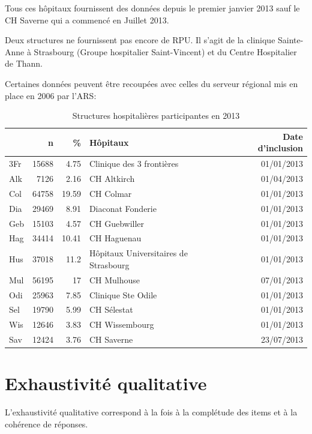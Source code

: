 \documentclass[12pt,english,french,twoside]{report}\usepackage[]{graphicx}\usepackage[]{color}
\begin{document}
Tous ces hôpitaux fournissent des données depuis le premier janvier 2013 sauf le CH Saverne qui a commencé en Juillet 2013.

Deux structures ne fournissent pas encore de RPU. Il s'agit de la clinique Sainte-Anne à Strasbourg (Groupe hospitalier Saint-Vincent) et du Centre Hospitalier de Thann.

Certaines données peuvent être recoupées avec celles du serveur régional mis en place en 2006 par l'ARS: 


\begin{table}[ht]
\centering
\begin{tabular}{|l|r|r|l|r|}
  \hline
 & n & \% & Hôpitaux & Date d'inclusion \\ 
  \hline
3Fr & 15688 & 4.75 & Clinique des 3 frontières & 01/01/2013 \\ 
  Alk & 7126 & 2.16 & CH Altkirch & 01/04/2013 \\ 
  Col & 64758 & 19.59 & CH Colmar & 01/01/2013 \\ 
  Dia & 29469 & 8.91 & Diaconat Fonderie & 01/01/2013 \\ 
  Geb & 15103 & 4.57 & CH Guebwiller & 01/01/2013 \\ 
  Hag & 34414 & 10.41 & CH Haguenau & 01/01/2013 \\ 
  Hus & 37018 & 11.2 & Hôpitaux Universitaires de Strasbourg & 01/01/2013 \\ 
  Mul & 56195 & 17 & CH Mulhouse & 07/01/2013 \\ 
  Odi & 25963 & 7.85 & Clinique Ste Odile & 01/01/2013 \\ 
  Sel & 19790 & 5.99 & CH Sélestat & 01/01/2013 \\ 
  Wis & 12646 & 3.83 & CH Wissembourg & 01/01/2013 \\ 
  Sav & 12424 & 3.76 & CH Saverne & 23/07/2013 \\ 
   \hline
\end{tabular}
\caption{Structures hospitalières participantes en 2013} 
\label{tab1}
\end{table}



\section{Exhaustivité qualitative}

L'exhaustivité qualitative correspond à la fois à la complétude des items et à la cohérence de réponses.
\end{document}
